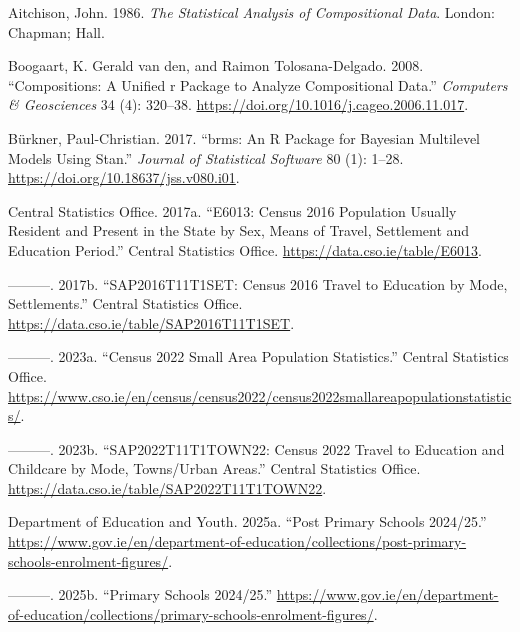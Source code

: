 \documentclass{article}
\newlength{\cslhangindent}
\newenvironment{CSLReferences}[2] %
 {\begin{list}{}{%
  \setlength{\itemindent}{0pt}
  \setlength{\leftmargin}{0pt}
  \setlength{\parsep}{0pt}
  \ifodd #1
   \setlength{\leftmargin}{\cslhangindent}
   \setlength{\itemindent}{-1\cslhangindent}
  \fi
  \setlength{\itemsep}{#2\baselineskip}}}
 {\end{list}}
\begin{document}
\label{refs}
\begin{CSLReferences}{1}{0}
Aitchison, John. 1986. \emph{The Statistical Analysis of Compositional
Data}. London: Chapman; Hall.

Boogaart, K. Gerald van den, and Raimon Tolosana-Delgado. 2008.
{``Compositions: A Unified r Package to Analyze Compositional Data.''}
\emph{Computers \& Geosciences} 34 (4): 320--38.
\url{https://doi.org/10.1016/j.cageo.2006.11.017}.

Bürkner, Paul-Christian. 2017. {``{brms}: An {R} Package for {Bayesian}
Multilevel Models Using {Stan}.''} \emph{Journal of Statistical
Software} 80 (1): 1--28. \url{https://doi.org/10.18637/jss.v080.i01}.

Central Statistics Office. 2017a. {``{E6013: Census 2016 Population
Usually Resident and Present in the State by Sex, Means of Travel,
Settlement and Education Period}.''} {Central Statistics Office}.
\url{https://data.cso.ie/table/E6013}.

---------. 2017b. {``{SAP2016T11T1SET: Census 2016 Travel to Education
by Mode, Settlements}.''} {Central Statistics Office}.
\url{https://data.cso.ie/table/SAP2016T11T1SET}.

---------. 2023a. {``{Census 2022 Small Area Population Statistics}.''}
{Central Statistics Office}.
\url{https://www.cso.ie/en/census/census2022/census2022smallareapopulationstatistics/}.

---------. 2023b. {``{SAP2022T11T1TOWN22: Census 2022 Travel to
Education and Childcare by Mode, Towns/Urban Areas}.''} {Central
Statistics Office}. \url{https://data.cso.ie/table/SAP2022T11T1TOWN22}.

Department of Education and Youth. 2025a. {``{Post Primary Schools
2024/25}.''}
\url{https://www.gov.ie/en/department-of-education/collections/post-primary-schools-enrolment-figures/}.

---------. 2025b. {``{Primary Schools 2024/25}.''}
\url{https://www.gov.ie/en/department-of-education/collections/primary-schools-enrolment-figures/}.


\end{CSLReferences}
\end{document}
